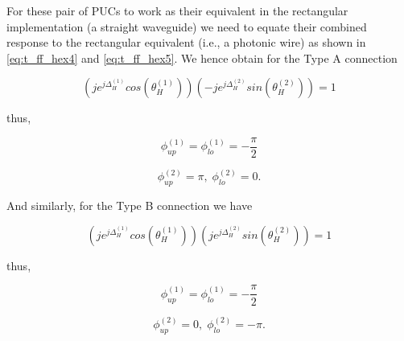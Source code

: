 For these pair of PUCs to work as their equivalent in the rectangular implementation (a straight waveguide) we need to equate their combined response to the rectangular equivalent (i.e., a photonic wire) as shown in \eqref{eq:t_ff_hex4} and \eqref{eq:t_ff_hex5}.
We hence obtain for the Type A connection

\begin{equation}
	\label{eq:t_ff_hex4}
	(je^{j\Delta^{(1)}_{H}}cos(\theta^{(1)}_{H}))(-je^{j\Delta^{(2)}_{H}}sin(\theta^{(2)}_{H})) = 1
\end{equation}

thus,

\begin{equation}
	\label{eq:map_ff_hex_a_1}
	\phi^{(1)}_{up} = \phi^{(1)}_{lo} = - \frac{\pi}{2}
\end{equation}

\begin{equation}
	\label{eq:map_ff_hex_a_2}
	\phi^{(2)}_{up} = \pi, \; \phi^{(2)}_{lo} = 0.
\end{equation}

And similarly, for the Type B connection we have

\begin{equation}
	\label{eq:t_ff_hex5}
	(je^{j\Delta^{(1)}_{H}}cos(\theta^{(1)}_{H}))(je^{j\Delta^{(2)}_{H}}sin(\theta^{(2)}_{H})) = 1
\end{equation}

thus,

\begin{equation}
	\label{eq:map_ff_hex_b_1}
	\phi^{(1)}_{up} = \phi^{(1)}_{lo} = - \frac{\pi}{2}
\end{equation}

\begin{equation}
	\label{eq:map_ff_hex_b_2}
	\phi^{(2)}_{up} = 0, \; \phi^{(2)}_{lo} = -\pi.
\end{equation}

